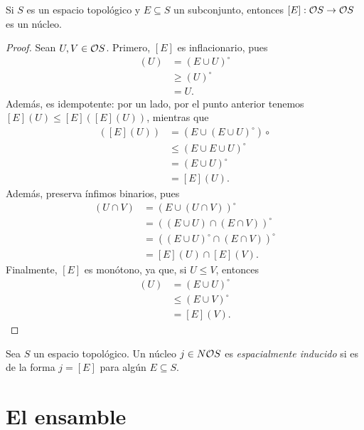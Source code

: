 \begin{prop}
  Si $S$ es un espacio topológico y $E\subseteq S$ un
  subconjunto, entonces $[E]:\cal OS\to\cal OS$ es un núcleo.
\end{prop}
\begin{proof}
  Sean $U,V\in\cal OS$.
  Primero, $[E]$ es inflacionario, pues
  \begin{align*}
    [E](U)
    &= (E\cup U)^\circ \\
    &\geq (U)^\circ \\
    &= U.
  \end{align*}
  Además, es idempotente: por un lado, por el punto anterior
  tenemos $[E](U)\leq[E]([E](U))$, mientras que
  \begin{align*}
    [E]([E](U))
    &= (E\cup (E\cup U)^\circ)\circ \\
    &\leq (E\cup E\cup U)^\circ \\
    &= (E\cup U)^\circ \\
    &= [E](U).
  \end{align*}
  Además, preserva ínfimos binarios, pues
  \begin{align*}
    [E](U\cap V)
    &= (E\cup(U\cap V))^\circ \\
    &= ((E\cup U)\cap(E\cap V))^\circ \\
    &= ((E\cup U)^\circ\cap(E\cap V))^\circ \\
    &= [E](U)\cap[E](V).
  \end{align*}
  Finalmente, $[E]$ es monótono, ya que, si $U\leq V$, entonces
  \begin{align*}
    [E](U)
    &= (E\cup U)^\circ \\
    &\leq (E\cup V)^\circ \\
    &= [E](V).
  \end{align*}
\end{proof}

\begin{defn}
  Sea $S$ un espacio topológico.
  Un núcleo $j\in N\cal O S$ es \emph{espacialmente
  inducido} si es de la forma $j=[E]$ para algún
  $E\subseteq S$.
\end{defn}


\part{El ensamble}
\label{part:ensamble}

